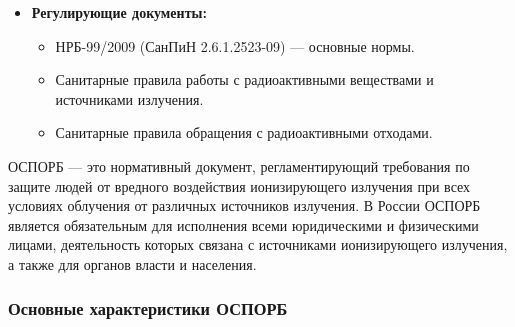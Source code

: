 \documentclass[a4paper, 14pt]{extarticle}
\begin{document}
\begin{itemize}
    \item \textbf{Регулирующие документы:}
          \begin{itemize}
              \item НРБ-99/2009 (СанПиН 2.6.1.2523-09) --- основные нормы.
              \item Санитарные правила работы с радиоактивными веществами и источниками излучения.
              \item Санитарные правила обращения с радиоактивными отходами.
          \end{itemize}
\end{itemize}

ОСПОРБ --- это нормативный документ, регламентирующий требования по защите людей от вредного воздействия ионизирующего излучения при всех условиях облучения от различных источников излучения. В России ОСПОРБ является обязательным для исполнения всеми юридическими и физическими лицами, деятельность которых связана с источниками ионизирующего излучения, а также для органов власти и населения.

\subsubsection*{Основные характеристики ОСПОРБ}
\end{document}
